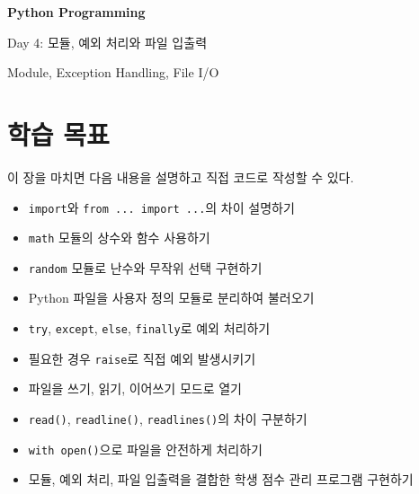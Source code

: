 \documentclass[11pt,a4paper]{article}
\begin{document}
\begin{titlepage}
    \centering
    \vspace*{3cm}

    {\Huge\bfseries Python Programming\par}
    \vspace{0.8cm}
    {\LARGE Day 4: 모듈, 예외 처리와 파일 입출력\par}

    \vspace{2cm}

    {\large Module, Exception Handling, File I/O\par}

    \vfill
\end{titlepage}

\tableofcontents
\newpage

\section{학습 목표}

\begin{learningbox}
이 장을 마치면 다음 내용을 설명하고 직접 코드로 작성할 수 있다.
\begin{itemize}[leftmargin=1.5em]
    \item \texttt{import}와 \texttt{from ... import ...}의 차이 설명하기
    \item \texttt{math} 모듈의 상수와 함수 사용하기
    \item \texttt{random} 모듈로 난수와 무작위 선택 구현하기
    \item Python 파일을 사용자 정의 모듈로 분리하여 불러오기
    \item \texttt{try}, \texttt{except}, \texttt{else}, \texttt{finally}로 예외 처리하기
    \item 필요한 경우 \texttt{raise}로 직접 예외 발생시키기
    \item 파일을 쓰기, 읽기, 이어쓰기 모드로 열기
    \item \texttt{read()}, \texttt{readline()}, \texttt{readlines()}의 차이 구분하기
    \item \texttt{with open()}으로 파일을 안전하게 처리하기
    \item 모듈, 예외 처리, 파일 입출력을 결합한 학생 점수 관리 프로그램 구현하기
\end{itemize}
\end{learningbox}
\end{document}
